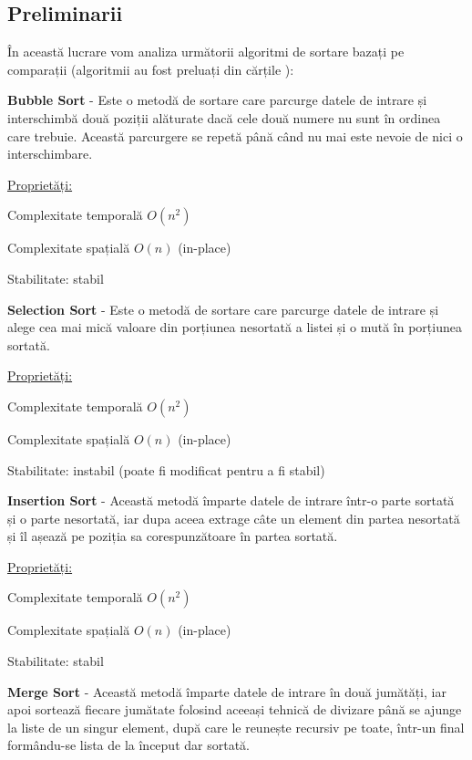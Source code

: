 \documentclass[12pt]{article}
\begin{document}
\subsection{Preliminarii}
\label{sub:prel}

În această lucrare vom analiza următorii algoritmi de sortare bazați pe comparații (algoritmii au fost preluați din cărțile
\cite{cormenIntroduction}\cite{skiena1998algorithm}\cite{sedgewick1998algorithms}):\newline

{\bf Bubble Sort} - Este o metodă de sortare care parcurge datele de intrare și interschimbă două poziții alăturate dacă cele două
numere nu sunt în ordinea care trebuie. Această parcurgere se repetă până când nu mai este nevoie de nici o interschimbare.

\underline {Proprietăți:}

Complexitate temporală $O(n^2)$

Complexitate spațială $O(n)$ (in-place)

Stabilitate: stabil\newline

{\bf Selection Sort} - Este o metodă de sortare care parcurge datele de intrare și alege cea mai mică valoare din porțiunea
nesortată a listei și o mută în porțiunea sortată.

\underline {Proprietăți:}

Complexitate temporală $O(n^2)$

Complexitate spațială $O(n)$ (in-place)

Stabilitate: instabil (poate fi modificat pentru a fi stabil)\newline

{\bf Insertion Sort} - Această metodă împarte datele de intrare într-o parte sortată și o parte nesortată, iar dupa aceea
extrage câte un element din partea nesortată și îl așează pe poziția sa corespunzătoare în partea sortată.

\underline {Proprietăți:}
    
Complexitate temporală $O(n^2)$

Complexitate spațială $O(n)$ (in-place)

Stabilitate: stabil\newline

{\bf Merge Sort} - Această metodă împarte datele de intrare în două jumătăți, iar apoi sortează fiecare jumătate folosind aceeași
tehnică de divizare până se ajunge la liste de un singur element, după care le reunește recursiv pe toate, într-un final formându-se
lista de la început dar sortată.
\end{document}
